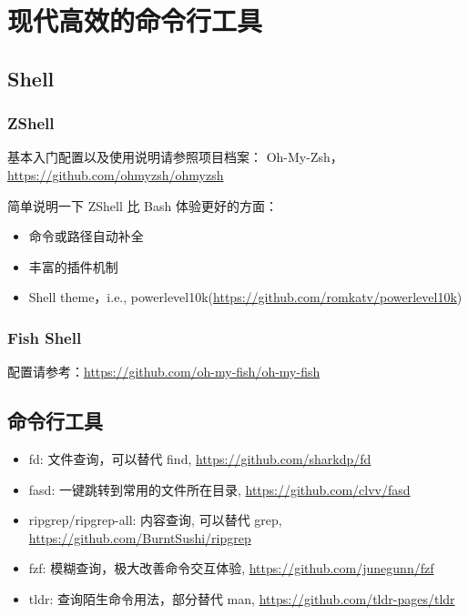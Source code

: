 \chapter{现代高效的命令行工具}

\section{Shell}
\label{sec:shell}

\subsection{ZShell}
\label{sec:zshell}

基本入门配置以及使用说明请参照项目档案： Oh-My-Zsh，\url{https://github.com/ohmyzsh/ohmyzsh}

简单说明一下 ZShell 比 Bash 体验更好的方面：
\begin{itemize}
\item 命令或路径自动补全
\item 丰富的插件机制
\item Shell theme，i.e., powerlevel10k(\url{https://github.com/romkatv/powerlevel10k})
\end{itemize}

\subsection{Fish Shell}
配置请参考：\url{https://github.com/oh-my-fish/oh-my-fish}

\section{命令行工具}

\begin{itemize}
\item fd: 文件查询，可以替代 find, \url{https://github.com/sharkdp/fd}
\item fasd: 一键跳转到常用的文件所在目录, \url{https://github.com/clvv/fasd}
\item ripgrep/ripgrep-all: 内容查询, 可以替代 grep, \url{https://github.com/BurntSushi/ripgrep}
\item fzf: 模糊查询，极大改善命令交互体验, \url{https://github.com/junegunn/fzf}
\item tldr: 查询陌生命令用法，部分替代 man, \url{https://github.com/tldr-pages/tldr}
\end{itemize}

\label{sec:tools}

